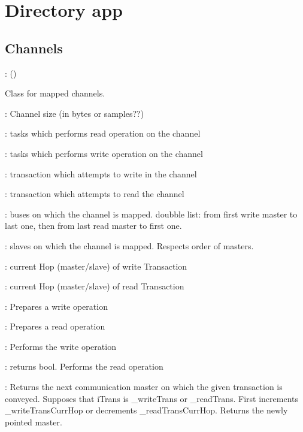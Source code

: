 \documentclass[a4paper,11pt]{article}
\newcommand{\bfont}{\fontseries{b}\selectfont}
\newcommand{\cod}[1]{{\ttfamily #1}}
\newcommand{\class}[2]{\par\vspace{1mm}\hspace{-5mm}\large\colorbox{file}{\textbullet\bfont\cod{#1}:} (\cod{#2})\par}
\newcommand{\method}[1]{\par\vspace{1mm}\hspace{-2mm}\colorbox{method}{\textopenbullet\bfont\cod{#1}:}}
\newcommand{\variable}[1]{\par\vspace{1mm}\hspace{-2mm}\colorbox{variable}{\textopenbullet\bfont\cod{#1}:}}
\begin{document}
\section*{Directory \cod{app}}

\subsection*{Channels}
\class{TMLChannel}{}
Class for mapped channels.
\variable{\_width} Channel size (in bytes or samples??)

\variable{\_readTask} tasks which performs read operation on the channel

\variable{\_writeTask} tasks which performs write operation on the channel

\variable{\_writeTrans} transaction which attempts to write in the channel

\variable{\_readTrans} transaction which attempts to read the channel

\variable{\_masters} buses on which the channel is mapped. doubble list: from first write master to last one, then from last read master to first one.

\variable{\_slaves} slaves on which the channel is mapped. Respects order of masters.

\variable{\_writeTransCurrHop} current Hop (master/slave) of write Transaction
	
\variable{\_readTransCurrHop} current Hop (master/slave) of read Transaction
	
\method{testWrite(iTrans)} Prepares a write operation

\method{testRead(iTrans)} Prepares a read operation

\method{write()} Performs the write operation

\method{read()} returns bool. Performs the read operation

\method{getNextMaster(iTrans)} Returns the next communication master on which the given transaction is conveyed. Supposes that \cod{iTrans} is \cod{\_writeTrans} or \cod{\_readTrans}. First increments \cod{\_writeTransCurrHop} or decrements \cod{\_readTransCurrHop}. Returns the newly pointed master.
\end{document}
